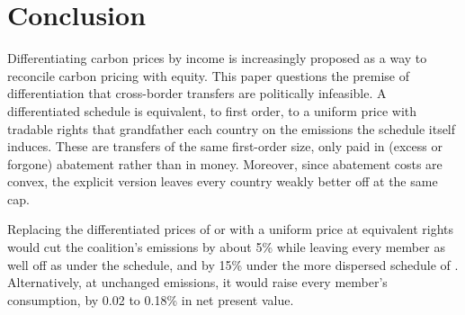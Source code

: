 \documentclass[12pt,english]{article}
\theoremstyle{remark}
\begin{document}

\FloatBarrier

\section{Conclusion}
\label{sec:conclusion}

Differentiating carbon prices by income is increasingly proposed as a way to reconcile carbon pricing with equity. This paper questions the premise of differentiation that cross-border transfers are politically infeasible. A differentiated schedule is equivalent, to first order, to a uniform price with tradable rights that grandfather each country on the emissions the schedule itself induces. These are transfers of the same first-order size, only paid in (excess or forgone) abatement rather than in money. 
Moreover, since abatement costs are convex, the explicit version leaves every country weakly better off at the same cap.

Replacing the differentiated prices of \citet{wolfram_building_2025} or \citet{banerjee_grand_2025} with a uniform price at equivalent rights would cut the coalition's emissions by about 5\% %
while leaving every member as well off as under the schedule, and by 15\% under the more dispersed schedule of \citet{equal_right_climate_2023}. Alternatively, at unchanged emissions, it would raise every member's consumption, by 0.02 to 0.18\% in net present value.
\end{document}
